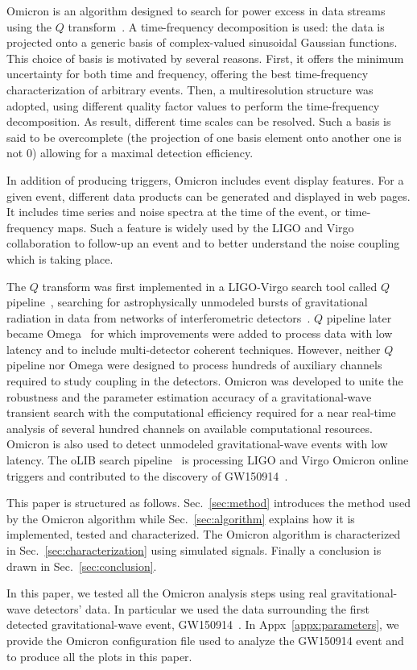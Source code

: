 Omicron is an algorithm designed to search for power excess in data streams using the $Q$ transform~\cite{Brown:1991}. A time-frequency decomposition is used: the data is projected onto a generic basis of complex-valued sinusoidal Gaussian functions. This choice of basis is motivated by several reasons. First, it offers the minimum uncertainty for both time and frequency, offering the best time-frequency characterization of arbitrary events. Then, a multiresolution structure was adopted, using different quality factor values to perform the time-frequency decomposition. As result, different time scales can be resolved. Such a basis is said to be overcomplete (the projection of one basis element onto another one is not 0) allowing for a maximal detection efficiency.

In addition of producing triggers, Omicron includes event display features. For a given event, different data products can be generated and displayed in web pages. It includes time series and noise spectra at the time of the event, or time-frequency maps. Such a feature is widely used by the LIGO and Virgo collaboration to follow-up an event and to better understand the noise coupling which is taking place.

The $Q$ transform was first implemented in a LIGO-Virgo search tool called $Q$ pipeline~\cite{Chatterji:2004}, searching for astrophysically unmodeled bursts of gravitational radiation in data from networks of interferometric detectors~\cite{Abbott:2009zi,Abbott:2009up,Abadie:2010mt}. $Q$ pipeline later became Omega~\cite{Rollins:2011} for which improvements were added to process data with low latency and to include multi-detector coherent techniques. However, neither $Q$ pipeline nor Omega were designed to process hundreds of auxiliary channels required to study coupling in the detectors. Omicron was developed to unite the robustness and the parameter estimation accuracy of a gravitational-wave transient search with the computational efficiency required for a near real-time analysis of several hundred channels on available computational resources. Omicron is also used to detect unmodeled gravitational-wave events with low latency. The oLIB search pipeline~\cite{Lynch:2015yin} is processing LIGO and Virgo Omicron online triggers and contributed to the discovery of GW150914~\cite{TheLIGOScientific:2016uux}.

This paper is structured as follows. Sec.~\ref{sec:method} introduces the method used by the Omicron algorithm while Sec.~\ref{sec:algorithm} explains how it is implemented, tested and characterized. The Omicron algorithm is characterized in Sec.~\ref{sec:characterization} using simulated signals. Finally a conclusion is drawn in Sec.~\ref{sec:conclusion}.

In this paper, we tested all the Omicron analysis steps using real gravitational-wave detectors' data. In particular we used the data surrounding the first detected gravitational-wave event, GW150914~\cite{GW150914data}. In Appx~\ref{appx:parameters}, we provide the Omicron configuration file used to analyze the GW150914 event and to produce all the plots in this paper.




